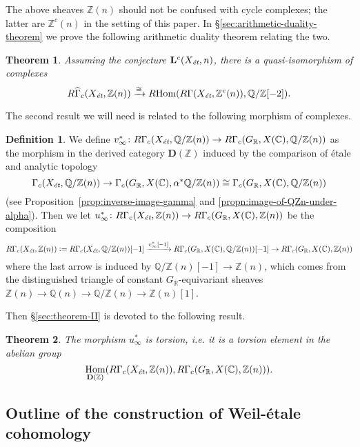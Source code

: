 \documentclass{article}
\DeclareMathOperator{\Hom}{Hom}
\newcommand{\CC}{\mathbb{C}}
\newcommand{\QQ}{\mathbb{Q}}
\newcommand{\RR}{\mathbb{R}}
\newcommand{\ZZ}{\mathbb{Z}}
\newcommand{\et}{\text{\it ét}}
\newcommand{\dfn}{\mathrel{\mathop:}=}
\newcommand{\RHom}{R\!\Hom}
\newtheorem{maintheorem}{Theorem}
\theoremstyle{definition}
\newtheorem{definition}[theorem]{Definition}
\numberwithin{equation}{section}
\begin{document}
The above sheaves $\ZZ (n)$ should not be confused with cycle complexes;
the latter are $\ZZ^c (n)$ in the setting of this paper.
In \S\ref{sec:arithmetic-duality-theorem} we prove the following arithmetic
duality theorem relating the two.

\begin{maintheorem}
  \label{theorem-I}
  Assuming the conjecture $\mathbf{L}^c (X_\et,n)$, there is a quasi-isomorphism
  of complexes
  \[ R\widehat{\Gamma}_c (X_\et, \ZZ (n)) \xrightarrow{\cong}
  \RHom (R\Gamma (X_\et, \ZZ^c (n)), \QQ/\ZZ [-2]). \]
\end{maintheorem}

The second result we will need is related to the following morphism of
complexes.

\begin{definition}
  \label{dfn:u-infty}
  We define
  $v_\infty^*\colon R\Gamma_c (X_\et, \QQ/\ZZ (n)) \to R\Gamma_c (G_\RR, X (\CC), \QQ/\ZZ (n))$
  as the morphism in the derived category $\mathbf{D} (\ZZ)$ induced by the
  comparison of étale and analytic topology
  \[ \Gamma_c (X_\et, \QQ/\ZZ (n)) \to
  \Gamma_c (G_\RR, X (\CC), \alpha^* \QQ/\ZZ (n)) \cong
  \Gamma_c (G_\RR, X (\CC), \QQ/\ZZ (n)) \]
  (see Proposition~\ref{prop:inverse-image-gamma} and
  \ref{propn:image-of-QZn-under-alpha}). Then we let
  $u_\infty^*\colon R\Gamma_c (X_\et, \ZZ(n)) \to R\Gamma_c (G_\RR, X (\CC), \ZZ (n))$
  be the composition
  \[ R\Gamma_c (X_\et, \ZZ(n)) \dfn R\Gamma_c (X_\et, \QQ/\ZZ (n)) [-1]
  \xrightarrow{v_\infty^* [-1]} R\Gamma_c (G_\RR, X (\CC), \QQ/\ZZ (n)) [-1] \to
  R\Gamma_c (G_\RR, X (\CC), \ZZ (n)) \]
  where the last arrow is induced by $\QQ/\ZZ (n) [-1] \to \ZZ (n)$, which comes
  from the distinguished triangle of constant $G_\RR$-equivariant sheaves
  $\ZZ (n) \to \QQ (n) \to \QQ/\ZZ (n) \to \ZZ (n) [1]$.
\end{definition}

Then \S\ref{sec:theorem-II} is devoted to the following result.

\begin{maintheorem}
  \label{theorem-II}
  The morphism $u_\infty^*$ is torsion, i.e. it is a torsion element in the
  abelian group
  $$\Hom_{\mathbf{D} (\ZZ)} (R\Gamma_c (X_\et, \ZZ(n)), R\Gamma_c (G_\RR, X (\CC), \ZZ(n))).$$
\end{maintheorem}

\subsection*{Outline of the construction of Weil-étale cohomology}
\end{document}
